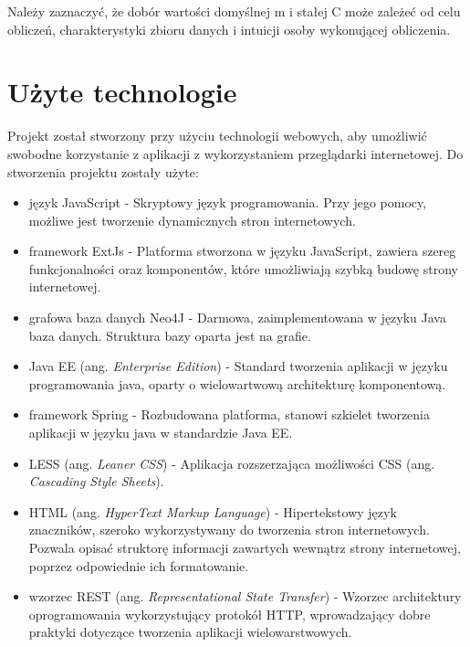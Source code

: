 Należy zaznaczyć, że dobór wartości domyślnej m i stałej C może zależeć od celu obliczeń, charakterystyki zbioru danych i intuicji osoby wykonującej obliczenia.

\section{Użyte technologie}
Projekt został stworzony przy użyciu technologii webowych, aby umożliwić swobodne korzystanie z aplikacji z wykorzystaniem przeglądarki internetowej. Do stworzenia projektu zostały użyte:
\begin{itemize}
\item język JavaScript - Skryptowy język programowania. Przy jego pomocy, możliwe jest tworzenie dynamicznych stron internetowych.\cite{js}
\item framework ExtJs - Platforma stworzona w języku JavaScript, zawiera szereg funkcjonalności oraz komponentów, które umożliwiają szybką budowę strony internetowej.\cite{extjs}
\item grafowa baza danych Neo4J - Darmowa, zaimplementowana w języku Java baza danych. Struktura bazy oparta jest na grafie.
\item Java EE (ang. \textit{Enterprise Edition}) - Standard tworzenia aplikacji w języku programowania java, oparty o wielowartwową architekturę komponentową.\cite{javaee}
\item framework Spring - Rozbudowana platforma, stanowi szkielet tworzenia aplikacji w języku java w standardzie Java EE.\cite{springAction}
\item LESS (ang. \textit{Leaner CSS}) - Aplikacja rozszerzająca możliwości CSS (ang. \textit{Cascading Style Sheets}).\cite{LESS}
\item HTML (ang. \textit{HyperText Markup Language}) - Hipertekstowy język znaczników, szeroko wykorzystywany do tworzenia stron internetowych. Pozwala opisać struktorę informacji zawartych wewnątrz strony internetowej, poprzez odpowiednie ich formatowanie.\cite{html}
\item wzorzec REST (ang. \textit{Representational State Transfer}) - Wzorzec architektury oprogramowania wykorzystujący protokół HTTP, wprowadzający dobre praktyki dotyczące tworzenia aplikacji wielowarstwowych.\cite{restWww}
\end{itemize}
